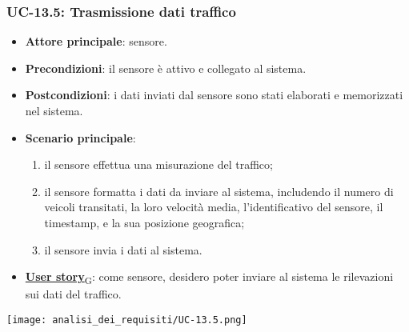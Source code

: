\subsubsection{UC-13.5: Trasmissione dati traffico}
\begin{itemize}
	\item \textbf{Attore principale}: sensore.
	\item \textbf{Precondizioni}: il sensore è attivo e collegato al sistema.
	\item \textbf{Postcondizioni}: i dati inviati dal sensore sono stati elaborati e memorizzati nel sistema.
	\item \textbf{Scenario principale}:
	      \begin{enumerate}
		      \item il sensore effettua una misurazione del traffico;
		      \item il sensore formatta i dati da inviare al sistema, includendo il numero di veicoli transitati, la loro velocità media, l'identificativo del sensore,
		            il timestamp, e la sua posizione geografica;
		      \item il sensore invia i dati al sistema.
	      \end{enumerate}
	\item \href{https://7last.github.io/docs/rtb/documentazione-interna/glossario\#user-story}{\textbf{User story}\textsubscript{G}}:
	      come sensore, desidero poter inviare al sistema le rilevazioni sui dati del traffico.
\end{itemize}

\begin{center}
	\texttt{[image: analisi\_dei\_requisiti/UC-13.5.png]}
\end{center}

